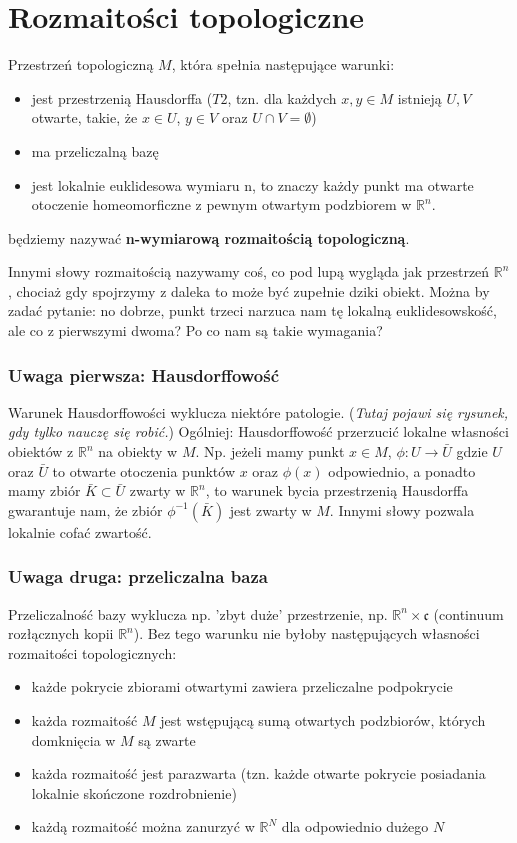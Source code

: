 \section{Rozmaitości topologiczne}
\begin{definition}
	Przestrzeń topologiczną $M$, która spełnia następujące warunki:
	\begin{itemize}
		\item jest przestrzenią Hausdorffa ($T2$, tzn. dla każdych $x,y \in M$ istnieją $U, V$ otwarte, takie, że $x \in U$, $y \in V$ oraz $U \cap V = \emptyset$)
		\item ma przeliczalną bazę
		\item jest lokalnie euklidesowa wymiaru n, to znaczy każdy punkt ma otwarte otoczenie homeomorficzne z pewnym otwartym podzbiorem w $\mathbb{R}^n$.
	\end{itemize}
	będziemy nazywać \textbf{n-wymiarową rozmaitością topologiczną}.
\end{definition}

Innymi słowy rozmaitością nazywamy coś, co pod lupą wygląda jak przestrzeń $\mathbb{R}^n$, chociaż gdy spojrzymy z daleka to może być zupełnie dziki obiekt. Można by zadać pytanie: no dobrze, punkt trzeci narzuca nam tę lokalną euklidesowskość, ale co z pierwszymi dwoma? Po co nam są takie wymagania?

\subsubsection{Uwaga pierwsza: Hausdorffowość}
Warunek Hausdorffowości wyklucza niektóre patologie. (\textit{Tutaj pojawi się rysunek, gdy tylko nauczę się robić.}) Ogólniej: Hausdorffowość przerzucić lokalne własności obiektów z $\mathbb{R}^n$ na obiekty w $M$. Np. jeżeli mamy punkt $x \in M$, $\phi : U \to \bar{U}$  gdzie $U$ oraz $\bar{U}$ to otwarte otoczenia punktów $x$ oraz $\phi(x)$ odpowiednio, a ponadto mamy zbiór $\bar{K} \subset \bar{U}$ zwarty w $\mathbb{R}^n$, to warunek bycia przestrzenią Hausdorffa gwarantuje nam, że zbiór $\phi^{-1}\left(\bar{K}\right)$ jest zwarty w $M$. Innymi słowy pozwala lokalnie cofać zwartość.

\subsubsection{Uwaga druga: przeliczalna baza}
Przeliczalność bazy wyklucza np. 'zbyt duże' przestrzenie, np. $\mathbb{R}^n \times \mathfrak{c}$ (continuum rozłącznych kopii $\mathbb{R}^n$). Bez tego warunku nie byłoby następujących własności rozmaitości topologicznych:
\begin{itemize}
	\item każde pokrycie zbiorami otwartymi zawiera przeliczalne podpokrycie
	\item każda rozmaitość $M$ jest wstępującą sumą otwartych podzbiorów, których domknięcia w $M$ są zwarte
	\item każda rozmaitość jest parazwarta (tzn. każde otwarte pokrycie posiadania lokalnie skończone rozdrobnienie)
	\item każdą rozmaitość można zanurzyć w $\mathbb{R}^N$ dla odpowiednio dużego $N$
\end{itemize}

